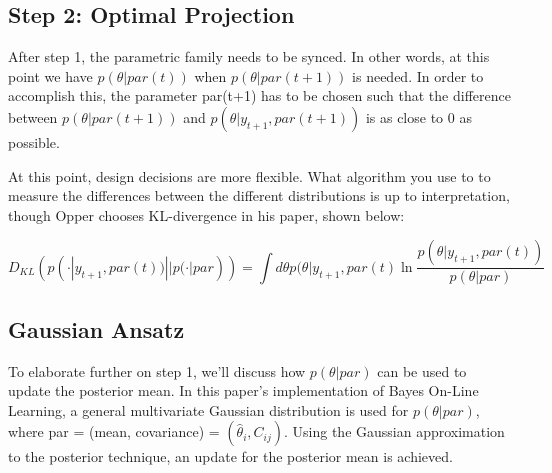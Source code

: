 																																																																																																																	\subsection{Step 2: Optimal Projection}

																																																																																																																	    After step 1, the parametric family needs to be synced. In other words, at this point we have $p(\theta | par(t))$ when $p(\theta | par(t+1))$ is needed. In order to accomplish this, the parameter par(t+1) has to be chosen such that the difference between $p(\theta | par(t+1))$ and $p(\theta | y_{t+1}, par(t+1))$ is as close to 0 as possible. \vspace{4mm}
																																																																																																																		    
																																																																																																																			    \noindent At this point, design decisions are more flexible. What algorithm you use to to measure the differences between the different distributions is up to interpretation, though Opper chooses KL-divergence in his paper, shown below: 
																																																																																																																				    
																																																																																																																					    $$D_{KL}(p(\cdot | y_{t+1}, par(t))||p(\cdot | par)) = \int d\theta p(\theta | y_{t+1}, par(t) \ln\frac{p(\theta | y_{t+1}, par(t))}{p(\theta | par)}$$
																																																																																																																						    
																																																																																																																							\subsection{Gaussian Ansatz}

																																																																																																																							    To elaborate further on step 1, we'll discuss how $p(\theta | par)$ can be used to update the posterior mean. In this paper's implementation of Bayes On-Line Learning, a general multivariate Gaussian distribution is used for $p(\theta | par)$, where par = (mean, covariance) = $ (\hat\theta_i , C_{ij})$. Using the Gaussian approximation to the posterior technique, an update for the posterior mean is achieved. \vspace{4mm}
																																																																																																																								    

